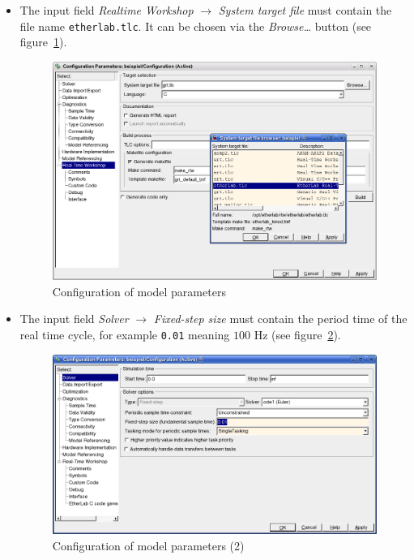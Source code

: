 \begin{itemize}

\item The input field \textit{Realtime Workshop} $\rightarrow$ \textit{System
target file} must contain the file name \texttt{etherlab.tlc}. It can be
chosen via the \textit{Browse\ldots} button (see
figure~\ref{fig:model-config}).

  \begin{figure}[htb]
    \begin{center}
      \includegraphics[width=.9\textwidth]{images/config_param.png}
      \caption{Configuration of model parameters}
      \label{fig:model-config}
    \end{center}
  \end{figure}

\item The input field \textit{Solver} $\rightarrow$ \textit{Fixed-step size}
must contain the period time of the real time cycle, for example
\lstinline+0.01+ meaning $100$ Hz (see figure~\ref{fig:config_solver}).

  \begin{figure}[htb]
    \begin{center}
      \includegraphics[width=.9\textwidth]{images/config_solver.png}
      \caption{Configuration of model parameters (2)}
      \label{fig:config_solver}
    \end{center}
  \end{figure}

\end{itemize}

